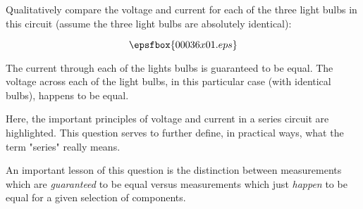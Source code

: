 

Qualitatively compare the voltage and current for each of the three light bulbs in this circuit (assume the three light bulbs are absolutely identical):

$$\epsfbox{00036x01.eps}$$







The current through each of the lights bulbs is guaranteed to be equal.  The voltage across each of the light bulbs, in this particular case (with identical bulbs), happens to be equal.







Here, the important principles of voltage and current in a series circuit are highlighted.  This question serves to further define, in practical ways, what the term "series" really means.

An important lesson of this question is the distinction between measurements which are {\it guaranteed} to be equal versus measurements which just {\it happen} to be equal for a given selection of components.




